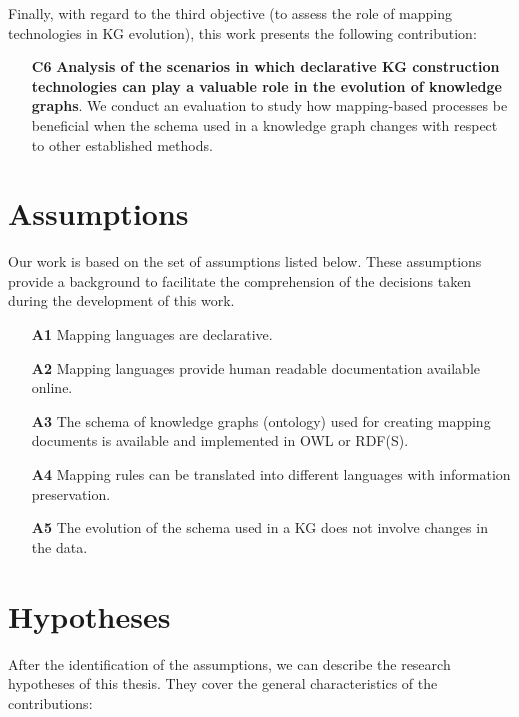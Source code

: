 Finally, with regard to the third objective (to assess the role of mapping technologies in KG evolution), this work presents the following contribution:

\begin{enumerate}
    \item[\textbf{C6}]\textbf{Analysis of the scenarios in which declarative KG construction technologies can play a valuable role in the evolution of knowledge graphs}. We conduct an evaluation to study how mapping-based processes be beneficial when the schema used in a knowledge graph changes with respect to other established methods.  %
\end{enumerate}


\section{Assumptions}
\label{sec:chp3-assumptions}
Our work is based on the set of assumptions listed below. These assumptions provide a background to facilitate the comprehension of the decisions taken during the development of this work. 


\begin{enumerate}
    \item[\textbf{A1}] Mapping languages are declarative.
    \item[\textbf{A2}] Mapping languages provide human readable documentation available online.
    \item[\textbf{A3}] The schema of knowledge graphs (ontology) used for creating mapping documents is available and implemented in OWL or RDF(S). 
    \item[\textbf{A4}] Mapping rules can be translated into different languages with information preservation. 
    \item[\textbf{A5}] The evolution of the schema used in a KG does not involve changes in the data.
\end{enumerate}


\section{Hypotheses}
\label{sec:chp3-hypotheses}

After the identification of the assumptions, we can describe the research hypotheses  of this thesis. They cover the general characteristics of the contributions:

